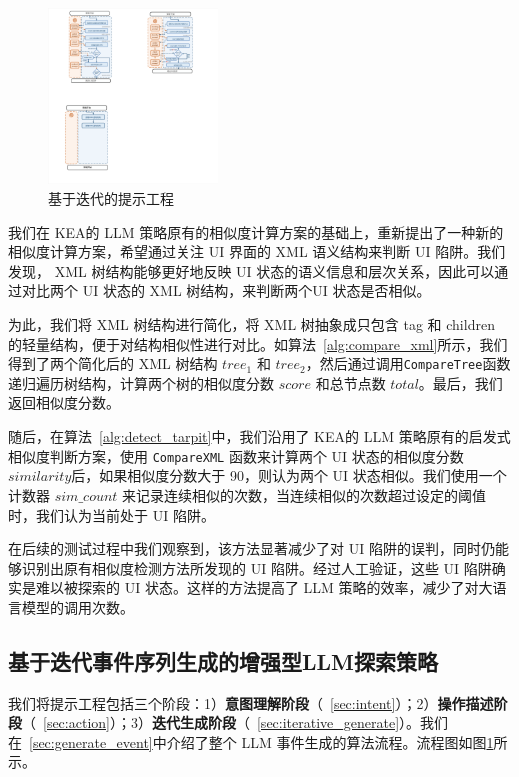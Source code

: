 \documentclass[twocolumn, 10pt]{article}
\newcommand{\kea}{K{\small\MakeUppercase{ea}}}
\begin{document}
\begin{figure}[t]
    \centering
    \includegraphics[width=0.4\textwidth]{pic}
    \caption{基于迭代的提示工程}
    \label{fig:process}
\end{figure}

我们在 \kea 的 LLM 策略原有的相似度计算方案的基础上，重新提出了一种新的相似度计算方案，希望通过关注 UI 界面的 XML 语义结构来判断 UI 陷阱。我们发现， XML 树结构能够更好地反映 UI 状态的语义信息和层次关系，因此可以通过对比两个 UI 状态的 XML 树结构，来判断两个UI 状态是否相似。

为此，我们将 XML 树结构进行简化，将 XML 树抽象成只包含 tag 和 children 的轻量结构，便于对结构相似性进行对比。如算法~\ref{alg:compare_xml}所示，我们得到了两个简化后的 XML 树结构 $tree_1$ 和 $tree_2$，然后通过调用\texttt{CompareTree}函数递归遍历树结构，计算两个树的相似度分数 $score$ 和总节点数 $total$。最后，我们返回相似度分数。

随后，在算法~\ref{alg:detect_tarpit}中，我们沿用了 \kea 的 LLM 策略原有的启发式相似度判断方案，使用 \texttt{CompareXML} 函数来计算两个 UI 状态的相似度分数 $similarity$后，如果相似度分数大于 90，则认为两个 UI 状态相似。我们使用一个计数器 $sim\_count$ 来记录连续相似的次数，当连续相似的次数超过设定的阈值时，我们认为当前处于 UI 陷阱。

在后续的测试过程中我们观察到，该方法显著减少了对 UI 陷阱的误判，同时仍能够识别出原有相似度检测方法所发现的 UI 陷阱。经过人工验证，这些 UI 陷阱确实是难以被探索的 UI 状态。这样的方法提高了 LLM 策略的效率，减少了对大语言模型的调用次数。

\subsection{基于迭代事件序列生成的增强型LLM探索策略}
\label{sec:iterative}

我们将提示工程包括三个阶段：1）\textbf{意图理解阶段}（\textsection~\ref{sec:intent}）；2）\textbf{操作描述阶段}（\textsection~\ref{sec:action}）；3）\textbf{迭代生成阶段}（\textsection~\ref{sec:iterative_generate}）。我们在\textsection~\ref{sec:generate_event}中介绍了整个 LLM 事件生成的算法流程。流程图如图\ref{fig:process}所示。
\end{document}
